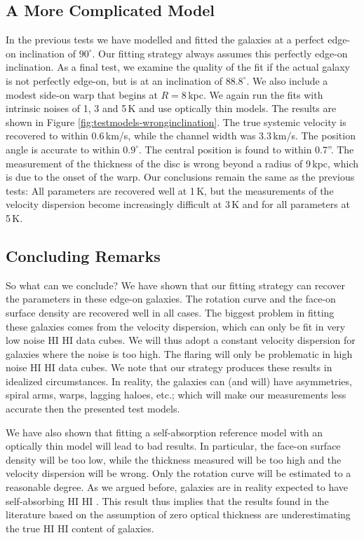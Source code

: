 \documentclass[useAMS,usenatbib]{mn2e}
\newcommand{\hi}{%
  \relax
  \ifmmode
    \textrm{\textsc{HI}}
  \else
    \textsc{H{\smaller}I}
  \fi
}
\begin{document}
\subsection{A More Complicated Model}\label{sec:notedgeon}
In the previous tests we have modelled and fitted the galaxies at 
a perfect edge-on inclination of $90^\circ$. \label{sec:whenHIgoesbad}
Our fitting strategy always assumes this perfectly edge-on inclination.
As a final test, we examine the quality of the fit if the actual 
galaxy is not perfectly edge-on, but is at an inclination of $88.8^\circ$.
We also include a modest side-on warp that begins at $R=8$\,kpc.
We again run the fits with intrinsic noises of 1, 3 and 5\,K 
and use optically thin models.
The results are shown in Figure \ref{fig:testmodels-wronginclination}. 
The true systemic velocity is recovered to within 0.6\,km/s, 
while the channel width was 3.3\,km/s.
The position angle is accurate to within $0.9^\circ$.
The central position is found to within 0.7''.
The measurement of the thickness of the disc is wrong beyond 
a radius of 9\,kpc, which is due to the onset of the warp.
Our conclusions remain the same as the previous tests: All 
parameters are recovered well at 1\,K, but the measurements of the 
velocity dispersion become increasingly difficult at 3\,K and for
all parameters at 5\,K. 


\subsection{Concluding Remarks}
So what can we conclude? 
We have shown that our fitting strategy can recover the parameters 
in these edge-on galaxies.
The rotation curve and the face-on surface density are recovered 
well in all cases.
The biggest problem in fitting these galaxies comes from the velocity 
dispersion, which can only be fit in very low noise  \hi data cubes.
We will thus adopt a constant velocity dispersion for galaxies where 
the noise is too high.
The flaring will only be problematic in high noise  \hi data cubes.
We note that our strategy produces these results in idealized circumstances.
In reality, the galaxies can (and will) have asymmetries, spiral arms, 
warps, lagging haloes, etc.; which will make our measurements less accurate 
then the presented test models.

We have also shown that fitting a self-absorption reference model with an 
optically thin model will lead to bad results. 
In particular, the face-on surface density will be too low, while the 
thickness measured will be too high and the velocity dispersion will be wrong.
Only the rotation curve will be estimated to a reasonable degree.
As we argued before, galaxies are in reality expected to have self-absorbing 
\hi. 
This result thus implies that the results found in the 
literature based on the assumption
of zero optical thickness are underestimating the true \hi content of
galaxies.
\end{document}
